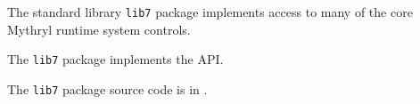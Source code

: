
The standard library {\tt lib7} package implements access to many of the 
core Mythryl runtime system controls.

The {\tt lib7} package implements the  API.

The {\tt lib7} package source code is in .




